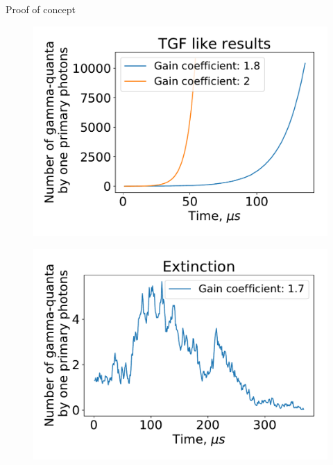 \documentclass[final,hyperref={pdfpagelabels=false}]{beamer}
\begin{document}
\begin{frame}{}
\begin{columns}[t]
\begin{column}{0.32\linewidth}
\begin{block}{Proof of concept}
\begin{figure}[htb]
                        \includegraphics[width=1\columnwidth]{proofTGF.pdf}
                    \end{figure}
                    \begin{figure}[htb]
                        \centering
                        \includegraphics[width=1\columnwidth]{Extinction.pdf}
                    \end{figure}
                    \begin{figure}[htb]
                        \centering

\end{figure}
\end{block}
\end{column}
\end{columns}
\end{frame}
\end{document}
